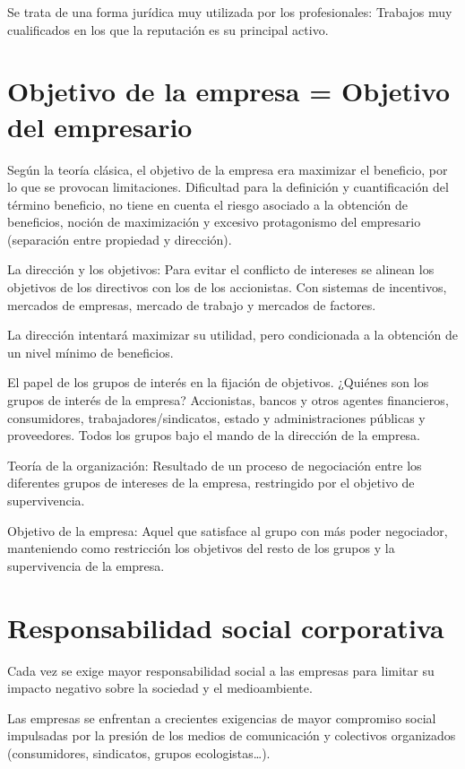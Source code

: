 \documentclass[12pt, twoside, openright]{report} %
\begin{document}
Se trata de una forma jurídica muy utilizada por los profesionales: Trabajos muy cualificados en los que la reputación es su principal activo.

\section{Objetivo de la empresa = Objetivo del empresario}

Según la teoría clásica, el objetivo de la empresa era maximizar el beneficio, por lo que se provocan limitaciones. Dificultad para la definición y cuantificación del término beneficio, no tiene en cuenta el riesgo asociado a la obtención de beneficios, noción de maximización y excesivo protagonismo del empresario (separación entre propiedad y dirección).

La dirección y los objetivos: Para evitar el conflicto de intereses se alinean los objetivos de los directivos con los de los accionistas. Con sistemas de incentivos, mercados de empresas, mercado de trabajo y mercados de factores.

La dirección intentará maximizar su utilidad, pero condicionada a la obtención de un nivel mínimo de beneficios.

El papel de los grupos de interés en la fijación de objetivos. ¿Quiénes son los grupos de interés de la empresa? Accionistas, bancos y otros agentes financieros, consumidores, trabajadores/sindicatos, estado y administraciones públicas y proveedores. Todos los grupos bajo el mando de la dirección de la empresa.

Teoría de la organización: Resultado de un proceso de negociación entre los diferentes grupos de intereses de la empresa, restringido por el objetivo de supervivencia.

Objetivo de la empresa: Aquel que satisface al grupo con más poder negociador, manteniendo como restricción los objetivos del resto de los grupos y la supervivencia de la empresa.

\section{Responsabilidad social corporativa}

Cada vez se exige mayor responsabilidad social a las empresas para limitar su impacto negativo sobre la sociedad y el medioambiente.

Las empresas se enfrentan a crecientes exigencias de mayor compromiso social impulsadas por la presión de los medios de comunicación y colectivos organizados (consumidores, sindicatos, grupos ecologistas…).
\end{document}
